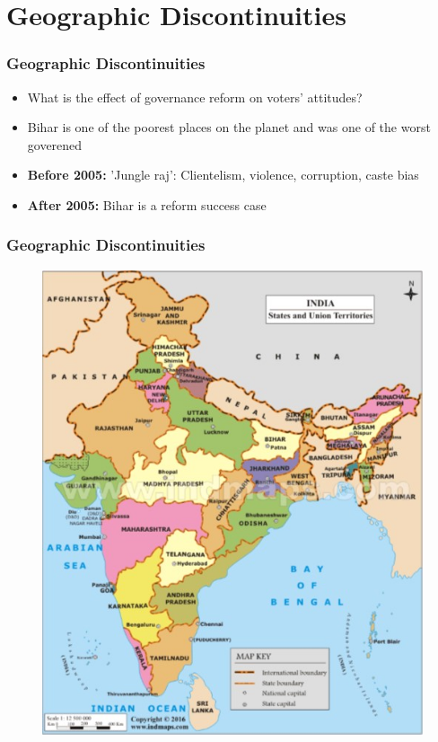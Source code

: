 \documentclass[xcolor=x11names,compress]{beamer}\usepackage[]{graphicx}\usepackage[]{color}
\renewcommand{\(}{\begin{columns}}
\renewcommand{\)}{\end{columns}}
\newcommand{\<}[1]{\begin{column}{#1}}
\renewcommand{\>}{\end{column}}
\begin{document}
\section{Geographic Discontinuities}

\begin{frame}
\frametitle{Geographic Discontinuities}
\begin{itemize}
\item What is the effect of governance reform on voters' attitudes?
\pause
\item Bihar is one of the poorest places on the planet and was one of the worst goverened
\pause
\item \textbf{Before 2005:} 'Jungle raj': Clientelism, violence, corruption, caste bias
\pause
\item \textbf{After 2005:} Bihar is a reform success case
\end{itemize}
\end{frame}

\begin{frame}
\frametitle{Geographic Discontinuities}
\begin{figure}
\includegraphics[scale=0.2]{figure/India_Map.jpg} 
\end{figure}
\end{frame}
\end{document}
